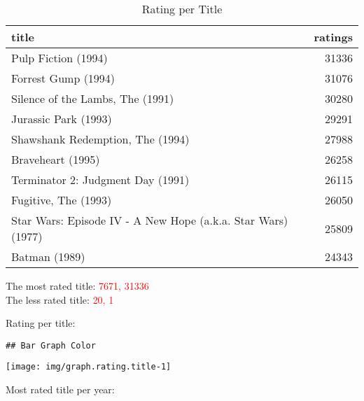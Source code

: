 \documentclass[]{article}
\begin{document}
\begin{table}[!h]

\caption{\label{tab:table.rating.title}Rating per Title}
\centering
\begin{tabular}{lr}
\toprule
title & ratings\\
\midrule
\rowcolor{gray!6}  Pulp Fiction (1994) & 31336\\
Forrest Gump (1994) & 31076\\
\rowcolor{gray!6}  Silence of the Lambs, The (1991) & 30280\\
Jurassic Park (1993) & 29291\\
\rowcolor{gray!6}  Shawshank Redemption, The (1994) & 27988\\
\addlinespace
Braveheart (1995) & 26258\\
\rowcolor{gray!6}  Terminator 2: Judgment Day (1991) & 26115\\
Fugitive, The (1993) & 26050\\
\rowcolor{gray!6}  Star Wars: Episode IV - A New Hope (a.k.a. Star Wars) (1977) & 25809\\
Batman (1989) & 24343\\
\bottomrule
\end{tabular}
\end{table}

The most rated title: \textcolor{red}{7671, 31336}\\
The less rated title: \textcolor{red}{20, 1}

Rating per title:

\begin{verbatim}
## Bar Graph Color
\end{verbatim}

\begin{center}\texttt{[image: img/graph.rating.title-1]} \end{center}

Most rated title per year:
\end{document}
